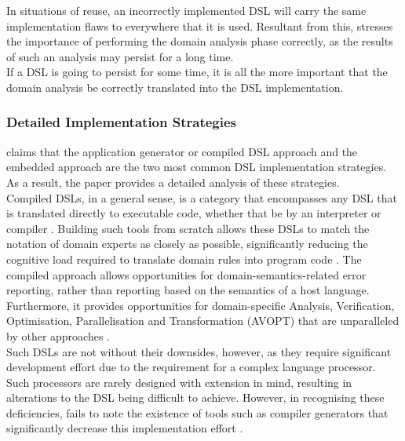 In situations of reuse, an incorrectly implemented DSL will carry the same implementation flaws to everywhere that it is used.
Resultant from this, \citet{Mernik:2005:DDL:1118890.1118892} stresses the importance of performing the domain analysis phase correctly, as the results of such an analysis may persist for a long time. \\

If a DSL is going to persist for some time, it is all the more important that the domain analysis be correctly translated into the DSL implementation. 


\subsubsection{Detailed Implementation Strategies} %
\label{ssub:detailed_implementation_strategies}
\citet{Mernik:2005:DDL:1118890.1118892} claims that the application generator or compiled DSL approach and the embedded approach are the two most common DSL implementation strategies. 
As a result, the paper provides a detailed analysis of these strategies. \\

Compiled DSLs, in a general sense, is a category that encompasses any DSL that is translated directly to executable code, whether that be by an interpreter or compiler \citep{Mernik:2005:DDL:1118890.1118892}. 
Building such tools from scratch allows these DSLs to match the notation of domain experts as closely as possible, significantly reducing the cognitive load required to translate domain rules into program code \citep{fowler2010domain}.
The compiled approach allows opportunities for domain-semantics-related error reporting, rather than reporting based on the semantics of a host language.
Furthermore, it provides opportunities for domain-specific Analysis, Verification, Optimisation, Parallelisation and Transformation (AVOPT) that are unparalleled by other approaches \citep{Mernik:2005:DDL:1118890.1118892}.\\

Such DSLs are not without their downsides, however, as they require significant development effort due to the requirement for a complex language processor. 
Such processors are rarely designed with extension in mind, resulting in alterations to the DSL being difficult to achieve. 
However, in recognising these deficiencies, \citet{Mernik:2005:DDL:1118890.1118892} fails to note the existence of tools such as compiler generators that significantly decrease this implementation effort \citep{Mandell:1966:MDA:800267.810785}. \\

